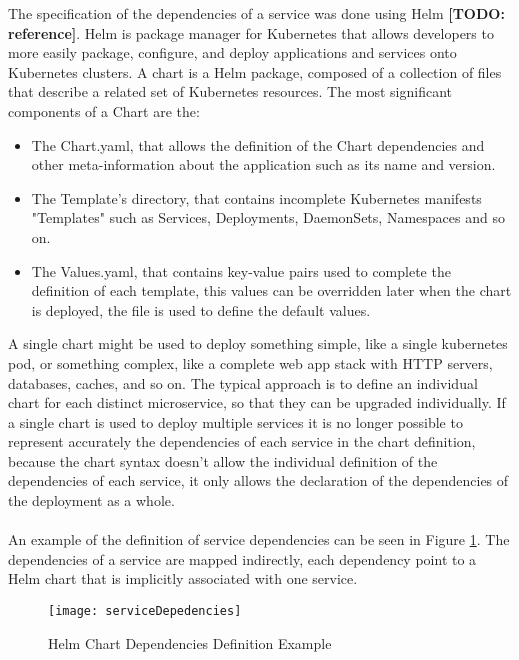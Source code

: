 The specification of the dependencies of a service was done using Helm \textbf{[TODO: reference]}.
Helm is package manager for Kubernetes that allows developers to more easily package, configure, and deploy applications and services onto Kubernetes clusters.
A chart is a Helm package, composed of a collection of files that describe a related set of Kubernetes resources.
The most significant components of a Chart are the:
\begin{itemize}
    \item The Chart.yaml, that allows the definition of the Chart dependencies and other meta-information about the application such as its name and version.
    \item The Template's directory, that contains incomplete Kubernetes manifests "Templates" such as Services, Deployments, DaemonSets, Namespaces and so on.
    \item The Values.yaml, that contains key-value pairs used to complete the definition of each template, this values can be overridden later when the chart is deployed, the file is used to define the default values.
\end{itemize}
A single chart might be used to deploy something simple, like a single kubernetes pod, or something complex, like a complete web app stack with HTTP servers, databases, caches, and so on.
The typical approach is to define an individual chart for each distinct microservice, so that they can be upgraded individually.
If a single chart is used to deploy multiple services it is no longer possible to represent accurately the dependencies of each service
in the chart definition, because the chart syntax doesn't allow the individual definition of the dependencies of each service, it only allows the declaration of the dependencies of the deployment as a whole.

\paragraph{}

An example of the definition of service dependencies can be seen in Figure \ref{fig:serviceDepedencies}.
The dependencies of a service are mapped indirectly, each dependency point to a Helm chart that is implicitly associated with one service.

\begin{figure}[htbp]
    \centering
    \texttt{[image: serviceDepedencies]}
    \caption{Helm Chart Dependencies Definition Example}
    \label{fig:serviceDepedencies}
\end{figure}

